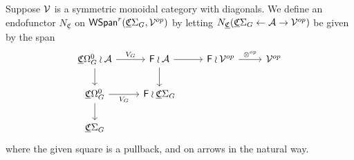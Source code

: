 \documentclass[a4paper,10pt
,draft
]{article}%
\newcommand{\UC}{\underline{\mathfrak C}}
\renewcommand{\1}{\ensuremath{\mathbb{id}}}
\begin{document}
\begin{definition}[{cf. \cite[Defn 4.16]{BP17}}]
      Suppose $\mathcal V$ is a symmetric monoidal category with diagonals.
      We define an endofunctor $N_{\UC}$ on $\mathsf{WSpan}^r(\UC\Sigma_G, \V^{op})$
      by letting $N_{\UC}(\UC\Sigma_G \leftarrow \mathcal A \to \V^{op})$ be given by the span
      \begin{equation}
            \begin{tikzcd}
                  \UC\Omega_G^0 \wr \mathcal A \arrow[d] \arrow[r, "V_G"]
                  &
                  \mathsf F \wr \mathcal A \arrow[d] \arrow[r]
                  &
                  \mathsf F \wr \V^{op} \arrow[r, "\otimes^{op}"]
                  &
                  \V^{op}
                  \\
                  \UC\Omega_G^0 \arrow[r, "V_G"'] \arrow[d]
                  &
                  \mathsf F \wr \UC\Sigma_G
                  \\
                  \UC\Sigma_G
            \end{tikzcd}
      \end{equation}
      where the given square is a pullback, and on arrows in the natural way.


\end{definition}
\end{document}
